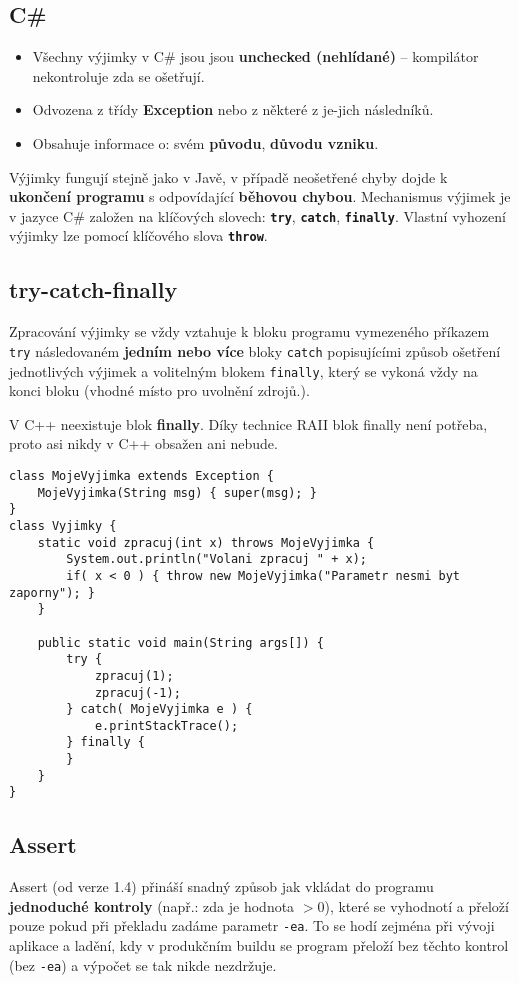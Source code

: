 \subsection{C\#}
\begin{itemize}
\item Všechny výjimky v C\# jsou jsou \textbf{unchecked (nehlídané)} -- kompilátor nekontroluje zda se ošetřují.
\item Odvozena z třídy \textbf{Exception} nebo z některé z je-jich následníků.
\item Obsahuje informace o: svém \textbf{původu}, \textbf{důvodu vzniku}.
\end{itemize}
Výjimky fungují stejně jako v Javě, v případě neošetřené chyby dojde k \textbf{ukončení programu} s odpovídající \textbf{běhovou chybou}. Mechanismus výjimek je v jazyce C\# založen na klíčových slovech: \texttt{\textbf{try}}, \texttt{\textbf{catch}}, \texttt{\textbf{finally}}. Vlastní vyhození výjimky lze pomocí klíčového slova \textbf{\texttt{throw}}.

\subsection{try-catch-finally}
Zpracování výjimky se vždy vztahuje k bloku programu vymezeného příkazem \texttt{try} následovaném \textbf{jedním nebo více} bloky \texttt{catch} popisujícími způsob ošetření jednotlivých výjimek a volitelným blokem \texttt{finally}, který se vykoná vždy na konci bloku (vhodné místo pro uvolnění zdrojů.).

V C++ neexistuje blok \textbf{finally}. Díky technice RAII blok finally není potřeba, proto asi nikdy v C++ obsažen ani nebude.

\begin{verbatim}
class MojeVyjimka extends Exception { 
	MojeVyjimka(String msg) { super(msg); } 
}
class Vyjimky {
	static void zpracuj(int x) throws MojeVyjimka { 
		System.out.println("Volani zpracuj " + x); 
		if( x < 0 ) { throw new MojeVyjimka("Parametr nesmi byt zaporny"); }
	} 
	
	public static void main(String args[]) { 
		try { 
			zpracuj(1); 
			zpracuj(-1); 
		} catch( MojeVyjimka e ) {  
			e.printStackTrace();  
		} finally {
		}
	} 
}
\end{verbatim}

\subsection{Assert}
Assert (od verze 1.4) přináší snadný způsob jak vkládat do programu \textbf{jednoduché kontroly} (např.: zda je hodnota $> 0$), které se vyhodnotí a přeloží pouze pokud při překladu zadáme parametr \texttt{-ea}. To se hodí zejména při vývoji aplikace a ladění, kdy v produkčním buildu se program přeloží bez těchto kontrol (bez \texttt{-ea}) a výpočet se tak nikde nezdržuje.

